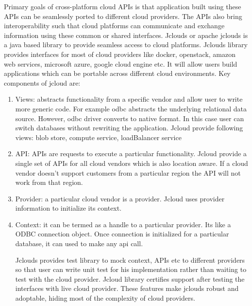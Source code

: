 \begin{enumerate}
\label{\detokenize{i524/technologies:id559}}{\hyperref[\detokenize{i524/technologies:cloud-portability-book}]{\sphinxcrossref{{[}479{]}}}} Primary goals of cross-platform
cloud APIs is that application built using these APIs can be
seamlessly ported to different cloud providers. The APIs also
bring interoperability such that cloud platforms can communicate
and exchange information using these common or shared interfaces.
Jclouds or apache jclouds \label{\detokenize{i524/technologies:id560}}{\hyperref[\detokenize{i524/technologies:www-jclouds}]{\sphinxcrossref{{[}480{]}}}} is a java based
library to provide seamless access to cloud platforms. Jclouds
library provides interfaces for most of cloud providers like
docker, openstack, amazon web services, microsoft azure, google
cloud engine etc. It will allow users build applications which
can be portable across different cloud environments.  Key
components of jcloud are:
\begin{enumerate}
\item {} 
Views: abstracts functionality from a specific vendor and
allow user to write more generic code. For example odbc
abstracts the underlying relational data source. However, odbc
driver converts to native format. In this case user can switch
databases without rewriting the application. Jcloud provide
following views: blob store, compute service, loadBalancer
service

\item {} 
API: APIs are requests to execute a particular
functionality. Jcloud provide a single set of APIs for all
cloud vendors which is also location aware. If a cloud vendor
doesn’t support customers from a particular region the API
will not work from that region.

\item {} 
Provider: a particular cloud vendor is a provider. Jcloud uses
provider information to initialize its context.

\item {} 
Context: it can be termed as a handle to a particular
provider. Its like a ODBC connection object. Once connection
is initialized for a particular database, it can used to make
any api call.

Jclouds provides test library to mock context, APIs etc to
different providers so that user can write unit test for his
implementation rather than waiting to test with the cloud
provider. Jcloud library certifies support after testing the
interfaces with live cloud provider. These features make
jclouds robust and adoptable, hiding most of the complexity of
cloud providers.


\end{enumerate}
\end{enumerate}
